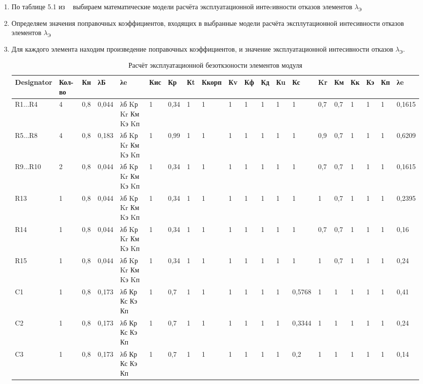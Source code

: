 \begin{enumerate}
\item По таблице 5.1 из ~\cite{Borovikov2010} выбираем математические
модели расчёта эксплуатационной интеcивности отказов элементов
$\lambda_{\text{Э}}$

\item Определяем значения поправочных коэффициентов, входящих в
выбранные модели расчёта эксплутационной интесивности отказов
элементов $\lambda_{\text{Э}}$
\item Для каждого элемента находим произведение поправочных
коэффициентов, и значение эксплуатационной интесивности отказов
$\lambda_{\text{Э}}$.

\begin{sidewaystable}
  \centering
  \small
  \caption{Расчёт эксплуатационной безоткзоности элементов модуля}
  \begin{tabular}{|l |l |l |l |l |l |l |l |l |l |l |l |l |l |l |l |l |l |l |l |}
    \hline
Designator & Кол-во  & Кн &   λБ   & λe  & Кис & Кр & Кt & Ккорп & Кv & Кф & Кд & Кu & Кс & Kr & Км & Кк & Кэ & Кп & λe   \\ \hline
R1...R4    & 4 & 0,8 & 0,044 & λб Kр Kr Км Kэ Kп  & 1 & 0,34 & 1 & 1 & 1 & 1 & 1 & 1 & 1 & 0,7 & 0,7 & 1 & 1 & 1 & 0,1615 \\ \hline
R5...R8    & 4 & 0,8 & 0,183 & λб Kр Kr Км Kэ Kп  & 1 & 0,99 & 1 & 1 & 1 & 1 & 1 & 1 & 1 & 0,9 & 0,7 & 1 & 1 & 1 & 0,6209 \\ \hline
R9...R10   & 2 & 0,8 & 0,044 & λб Kр Kr Км Kэ Kп  & 1 & 0,34 & 1 & 1 & 1 & 1 & 1 & 1 & 1 & 0,7 & 0,7 & 1 & 1 & 1 & 0,1615 \\ \hline
R13        & 1 & 0,8 & 0,044 & λб Kр Kr Км Kэ Kп  & 1 & 0,34 & 1 & 1 & 1 & 1 & 1 & 1 & 1 & 1 & 0,7 & 1 & 1 & 1 & 0,2395  \\ \hline
R14        & 1 & 0,8 & 0,044 & λб Kр Kr Км Kэ Kп  & 1 & 0,34 & 1 & 1 & 1 & 1 & 1 & 1 & 1 & 0,7 & 0,7 & 1 & 1 & 1 & 0,16 \\ \hline
R15        & 1 & 0,8 & 0,044 & λб Kр Kr Км Kэ Kп  & 1 & 0,34 & 1 & 1 & 1 & 1 & 1 & 1 & 1 & 1 & 0,7 & 1 & 1 & 1 & 0,24  \\ \hline
C1         & 1 & 0,8 & 0,173 & λб Кр Кс Кэ Кп  & 1 & 0,7 & 1 & 1 & 1 & 1 & 1 & 1 & 0,5768 & 1 & 1 & 1 & 1 & 1 & 0,41 \\ \hline
C2         & 1 & 0,8 & 0,173 & λб Кр Кс Кэ Кп  & 1 & 0,7 & 1 & 1 & 1 & 1 & 1 & 1 & 0,3344 & 1 & 1 & 1 & 1 & 1 & 0,24 \\ \hline
C3         & 1 & 0,8 & 0,173 & λб Кр Кс Кэ Кп  & 1 & 0,7 & 1 & 1 & 1 & 1 & 1 & 1 & 0,2 & 1 & 1 & 1 & 1 & 1 & 0,14 \\ \hline

\end{tabular}
\end{sidewaystable}
\end{enumerate}
